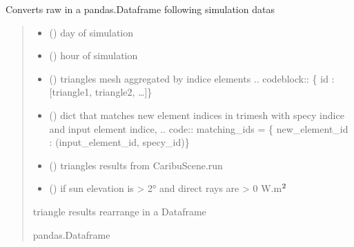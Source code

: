 \documentclass[letterpaper,10pt,english]{sphinxmanual}
\begin{document}

\begin{fulllineitems}
\label{\detokenize{reference:outputs.out_caribu_triangles}}
\pysigstartsignatures
{}
\pysigstopsignatures
\sphinxAtStartPar
Converts raw in a pandas.Dataframe following simulation datas
\begin{quote}\begin{description}
\begin{itemize}
\item {} 
\sphinxAtStartPar
{} () \textendash{} day of simulation

\item {} 
\sphinxAtStartPar
{} () \textendash{} hour of simulation

\item {} 
\sphinxAtStartPar
{} () \textendash{} triangles mesh aggregated by indice elements
.. code\sphinxhyphen{}block:: \{ id : {[}triangle1, triangle2, …{]}\}

\item {} 
\sphinxAtStartPar
{} () \textendash{} dict that matches new element indices in trimesh with specy indice and
input element indice, 
.. code:: matching\_ids = \{ new\_element\_id : (input\_element\_id, specy\_id)\}

\item {} 
\sphinxAtStartPar
{} () \textendash{} triangles results from CaribuScene.run

\item {} 
\sphinxAtStartPar
{} () \textendash{} if sun elevation is \textgreater{} 2° and direct rays are \textgreater{} 0 W.m\(\sp{\text{2}}\)

\end{itemize}

\sphinxAtStartPar
triangle results rearrange in a Dataframe

\sphinxAtStartPar
pandas.Dataframe

\end{description}\end{quote}

\end{fulllineitems}
\end{document}
